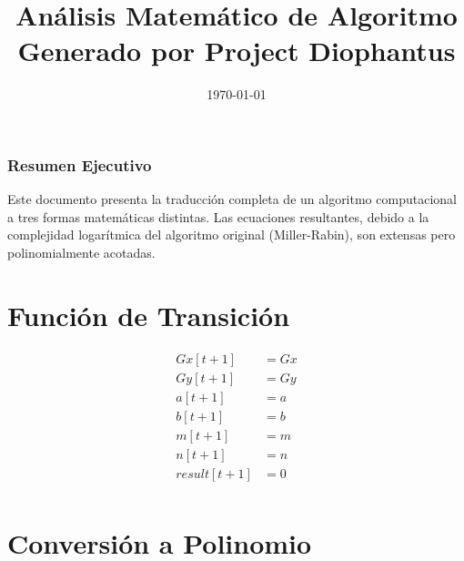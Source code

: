 \documentclass[10pt, a4paper]{article}
\title{Análisis Matemático de Algoritmo \\ \large Generado por Project Diophantus}
\author{}
\date{\today}
\begin{document}
\maketitle
\section*{Resumen Ejecutivo}
Este documento presenta la traducción completa de un algoritmo computacional a tres formas matemáticas distintas.
Las ecuaciones resultantes, debido a la complejidad logarítmica del algoritmo original (Miller-Rabin), son extensas pero polinomialmente acotadas.
\part{Función de Transición}
\begin{align*}
Gx[t+1] &= Gx \\
Gy[t+1] &= Gy \\
a[t+1] &= a \\
b[t+1] &= b \\
m[t+1] &= m \\
n[t+1] &= n \\
result[t+1] &= 0 \\
\end{align*}\part{Conversión a Polinomio}
\end{document}
